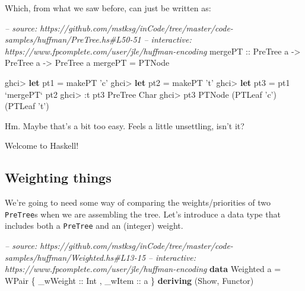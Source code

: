 \documentclass[]{article}
\newenvironment{Shaded}{}{}
\newcommand{\KeywordTok}[1]{\textcolor[rgb]{0.00,0.44,0.13}{\textbf{{#1}}}}
\newcommand{\DataTypeTok}[1]{\textcolor[rgb]{0.56,0.13,0.00}{{#1}}}
\newcommand{\CharTok}[1]{\textcolor[rgb]{0.25,0.44,0.63}{{#1}}}
\newcommand{\CommentTok}[1]{\textcolor[rgb]{0.38,0.63,0.69}{\textit{{#1}}}}
\newcommand{\OtherTok}[1]{\textcolor[rgb]{0.00,0.44,0.13}{{#1}}}
\newcommand{\FunctionTok}[1]{\textcolor[rgb]{0.02,0.16,0.49}{{#1}}}
\newcommand{\NormalTok}[1]{{#1}}
\begin{document}
Which, from what we saw before, can just be written as:

\begin{Shaded}
\begin{Highlighting}[]
\CommentTok{-- source: https://github.com/mstksg/inCode/tree/master/code-samples/huffman/PreTree.hs#L50-51}
\CommentTok{-- interactive: https://www.fpcomplete.com/user/jle/huffman-encoding}
\OtherTok{mergePT ::} \DataTypeTok{PreTree} \NormalTok{a }\OtherTok{->} \DataTypeTok{PreTree} \NormalTok{a }\OtherTok{->} \DataTypeTok{PreTree} \NormalTok{a}
\NormalTok{mergePT }\FunctionTok{=} \DataTypeTok{PTNode}
\end{Highlighting}
\end{Shaded}

\begin{Shaded}
\begin{Highlighting}[]
\NormalTok{ghci}\FunctionTok{>} \KeywordTok{let} \NormalTok{pt1 }\FunctionTok{=} \NormalTok{makePT }\CharTok{'c'}
\NormalTok{ghci}\FunctionTok{>} \KeywordTok{let} \NormalTok{pt2 }\FunctionTok{=} \NormalTok{makePT }\CharTok{'t'}
\NormalTok{ghci}\FunctionTok{>} \KeywordTok{let} \NormalTok{pt3 }\FunctionTok{=} \NormalTok{pt1 }\OtherTok{`mergePT`} \NormalTok{pt2}
\NormalTok{ghci}\FunctionTok{>} \FunctionTok{:}\NormalTok{t pt3}
\DataTypeTok{PreTree} \DataTypeTok{Char}
\NormalTok{ghci}\FunctionTok{>} \NormalTok{pt3}
\DataTypeTok{PTNode} \NormalTok{(}\DataTypeTok{PTLeaf} \CharTok{'c'}\NormalTok{) (}\DataTypeTok{PTLeaf} \CharTok{'t'}\NormalTok{)}
\end{Highlighting}
\end{Shaded}

Hm. Maybe that's a bit too easy. Feels a little unsettling, isn't it?

Welcome to Haskell!

\subsection{Weighting things}\label{weighting-things}

We're going to need some way of comparing the weights/priorities of two
\texttt{PreTree}s when we are assembling the tree. Let's introduce a data type
that includes both a \texttt{PreTree} and an (integer) weight.

\begin{Shaded}
\begin{Highlighting}[]
\CommentTok{-- source: https://github.com/mstksg/inCode/tree/master/code-samples/huffman/Weighted.hs#L13-15}
\CommentTok{-- interactive: https://www.fpcomplete.com/user/jle/huffman-encoding}
\KeywordTok{data} \DataTypeTok{Weighted} \NormalTok{a }\FunctionTok{=} \DataTypeTok{WPair} \NormalTok{\{}\OtherTok{ _wWeight ::} \DataTypeTok{Int}
                        \NormalTok{,}\OtherTok{ _wItem   ::} \NormalTok{a}
                        \NormalTok{\} }\KeywordTok{deriving} \NormalTok{(}\DataTypeTok{Show}\NormalTok{, }\DataTypeTok{Functor}\NormalTok{)}
\end{Highlighting}
\end{Shaded}
\end{document}
